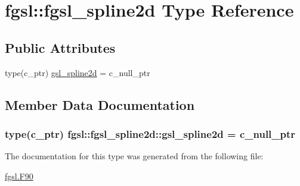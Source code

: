 \hypertarget{structfgsl_1_1fgsl__spline2d}{}\section{fgsl\+:\+:fgsl\+\_\+spline2d Type Reference}
\label{structfgsl_1_1fgsl__spline2d}
\subsection*{Public Attributes}
\begin{DoxyCompactItemize}
\item 
type(c\+\_\+ptr) \hyperlink{structfgsl_1_1fgsl__spline2d_a792aa012939b15e6f02ba83dfd85e216}{gsl\+\_\+spline2d} = c\+\_\+null\+\_\+ptr
\end{DoxyCompactItemize}


\subsection{Member Data Documentation}
\hypertarget{structfgsl_1_1fgsl__spline2d_a792aa012939b15e6f02ba83dfd85e216}{}
\subsubsection[{gsl\+\_\+spline2d}]{\setlength{\rightskip}{0pt plus 5cm}type(c\+\_\+ptr) fgsl\+::fgsl\+\_\+spline2d\+::gsl\+\_\+spline2d = c\+\_\+null\+\_\+ptr}\label{structfgsl_1_1fgsl__spline2d_a792aa012939b15e6f02ba83dfd85e216}


The documentation for this type was generated from the following file\+:\begin{DoxyCompactItemize}
\item 
\hyperlink{fgsl_8F90}{fgsl.\+F90}\end{DoxyCompactItemize}
